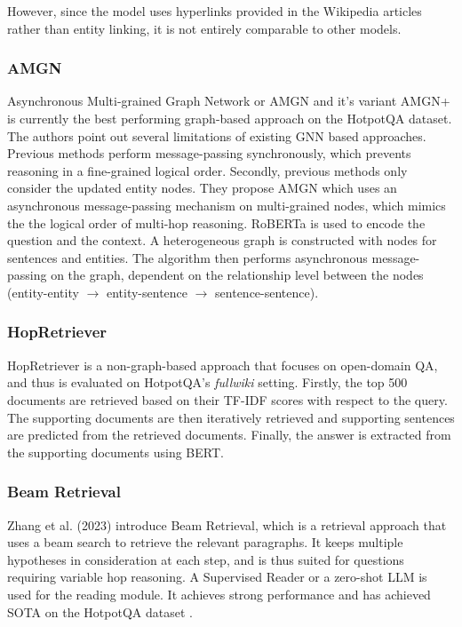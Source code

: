 \documentclass[sigplan,screen,nonacm]{acmart}
\begin{document}
However, since the model uses hyperlinks provided in the Wikipedia articles rather than entity linking, it is not entirely comparable to other 
models.

\subsubsection{AMGN}
Asynchronous Multi-grained Graph Network \cite{RN131} or AMGN and it's variant AMGN+ is currently the best performing graph-based approach on the HotpotQA dataset.
The authors point out several limitations of existing GNN based approaches. Previous methods perform message-passing synchronously,
which prevents reasoning in a fine-grained logical order. Secondly, previous methods only consider the  updated entity nodes.
They propose AMGN which uses an asynchronous message-passing mechanism on multi-grained nodes, which mimics the the logical order of multi-hop 
reasoning. RoBERTa \cite{RN171} is used to encode the question and the context. A heterogeneous graph is constructed with nodes for sentences 
and entities. The algorithm then performs asynchronous message-passing on the graph, dependent on the relationship level between the nodes 
(entity-entity $\to$ entity-sentence $\to$ sentence-sentence).

\subsubsection{HopRetriever}
HopRetriever \cite{RN149} is a non-graph-based approach that focuses on open-domain QA, and thus is evaluated on HotpotQA's \emph{fullwiki} 
setting. Firstly, the top 500 documents are retrieved based on their TF-IDF scores with respect to the query. The supporting documents
are then iteratively retrieved and supporting sentences are predicted from the retrieved documents. Finally, the answer is extracted 
from the supporting documents using BERT.

\subsubsection{Beam Retrieval}
 Zhang et al. (2023)\cite{RN105} introduce Beam Retrieval, which is a retrieval approach that uses a beam search to retrieve the relevant 
 paragraphs. It keeps multiple hypotheses in consideration at each step, and is thus suited for questions requiring variable hop reasoning. 
 A Supervised Reader or a zero-shot LLM is used for the reading module. It achieves strong performance and has achieved SOTA on the 
 HotpotQA dataset \cite{RN116}.
\end{document}
